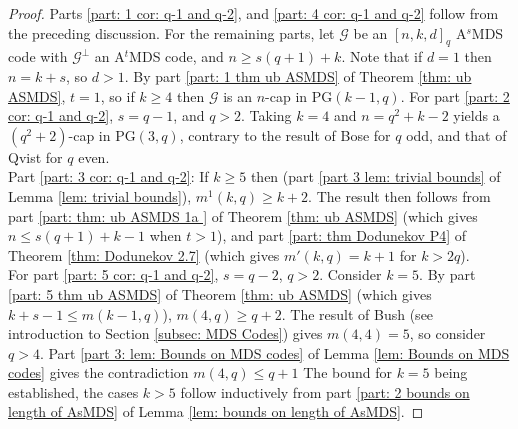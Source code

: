 \documentclass[11pt,a4paper]{amsart}
\newcommand{\AS}{ A$^s$MDS }
\newcommand{\G}{\mathcal{G}}
\theoremstyle{plain}
\theoremstyle{definition}
\theoremstyle{remark}
\begin{document}
	\begin{proof}
		Parts \ref{part: 1 cor: q-1 and q-2}, and \ref{part: 4 cor: q-1 and q-2} follow from the preceding discussion.
		For the remaining parts, let $\G$ be an $[n,k,d]_q$ \AS	code with $ \G^\perp $ an A$^t$MDS code, and $n\ge s(q+1)+k$. Note that if $d=1$ then $n=k+s$, so $d>1$. By part \ref{part: 1 thm ub ASMDS} of Theorem  \ref{thm: ub ASMDS}, $t=1$, so if $k\ge 4$ then $\G$ is an $n$-cap in PG$(k-1,q)$.
		For part \ref{part: 2 cor: q-1 and q-2},  $s=q-1$, and $q>2$. Taking $k=4$ and $n=q^2+k-2$ yields a $(q^2+2)$-cap in PG$(3,q)$, contrary to the result of Bose \cite{Bose1947} for $q$ odd, and that of Qvist \cite{Qvist1952} for $q$ even.\\
		Part \ref{part: 3 cor: q-1 and q-2}: If $k\ge 5$ then (part \ref{part 3 lem: trivial bounds} of Lemma \ref{lem: trivial bounds}), $m^1(k,q)\ge k+2$. The result then follows from part \ref{part: thm: ub ASMDS 1a } of Theorem \ref{thm: ub ASMDS} (which gives $n\le s(q+1)+k-1$ when $t>1$), and part \ref{part: thm Dodunekov P4} of Theorem \ref{thm: Dodunekov 2.7} (which gives $m'(k,q)=k+1$ for $k>2q$).\\
		For part \ref{part: 5 cor: q-1 and q-2},  $s=q-2$, $q>2$. Consider $k=5$.  By part \ref{part: 5 thm ub ASMDS} of Theorem  \ref{thm: ub ASMDS} (which gives $k+s-1\le m(k-1,q)$), $m(4,q)\ge q+2$. The result of Bush \cite{Bush1952} (see introduction to Section \ref{subsec: MDS Codes}) gives $m(4,4)=5$, so consider $q>4$. Part \ref{part 3: lem: Bounds on MDS codes} of Lemma \ref{lem: Bounds on MDS codes} gives the contradiction $ m(4,q)\le q+1$  The bound for $k=5$ being established, the cases $k>5$ follow inductively from part \ref{part: 2 bounds on length of AsMDS} of Lemma \ref{lem: bounds on length of AsMDS}.
	\end{proof}
\end{document}

